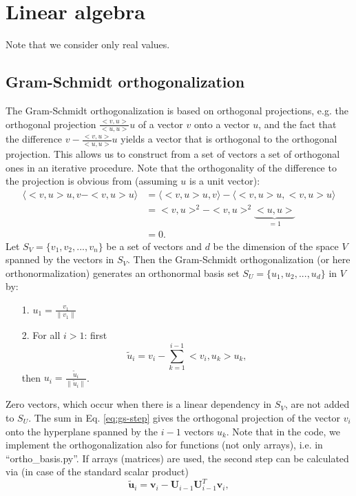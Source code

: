 \documentclass[11pt, a4paper, parskip=half*, bibliography=totoc, cleardoublepage=empty, final,
numbers=noenddot]{scrbook}
\begin{document}
\chapter{Linear algebra}
Note that we consider only real values.
\section{Gram-Schmidt orthogonalization}
The Gram-Schmidt orthogonalization is based on orthogonal projections, e.g. the orthogonal projection $\frac{<v, u>} {<u, u>} u$ of a vector $v$ onto a vector $u$, and the fact that the difference $v - \frac{<v, u>}{<u, u>} u$ yields a vector that is orthogonal to the orthogonal projection. This allows us to construct from a set of vectors a set of orthogonal ones in an iterative procedure. Note that the orthogonality of the difference to the projection is obvious from (assuming $u$ is a unit vector):
\begin{align}
\langle <v, u> u, v- <v, u> u \rangle &= \langle <v, u> u, v \rangle - \langle <v, u> u, <v, u> u \rangle \\
&= <v, u>^2 - <v, u>^2 \underbrace{<u, u>}_{=1} \\
&= 0.
\label{eq:orthogonal-proj-zero}
\end{align}
Let $S_V = \{v_1, v_2, ..., v_n\}$ be a set of vectors and $d$ be the dimension of the space $V$ spanned by the vectors in $S_V$. Then the Gram-Schmidt orthogonalization (or here orthonormalization) generates an orthonormal basis set $S_U = \{u_1, u_2, ..., u_d\}$ in $V$ by:
\begin{itemize}
\item[1.] $u_1 = \frac{v_1}{\| v_1\|}$
\item[2.] For all $i>1$: first
\begin{equation}
\tilde{u}_i = v_i - \sum_{k=1}^{i-1} <v_i, u_k> u_k     ,
\label{eq:gs-step}
\end{equation} 
then $u_i = \frac{\tilde{u}_i}{\| \tilde{u}_i\|}$.
\end{itemize}
Zero vectors, which occur when there is a linear dependency in $S_V$, are not added to $S_U$. The sum in Eq. \ref{eq:gs-step} gives the orthogonal projection of the vector $v_i$ onto the hyperplane spanned by the $i-1$ vectors $u_k$. Note that in the code, we implement the orthogonalization also for functions (not only arrays), i.e. in ``ortho\_basis.py''. If arrays (matrices) are used, the second step can be calculated via (in case of the standard scalar product)
\begin{equation}
\tilde{\bm{u}}_i = \bm{v}_i - \bm{U}_{i-1}  \bm{U}^T_{i-1}  \bm{v}_i     ,
\end{equation} 
\end{document}
